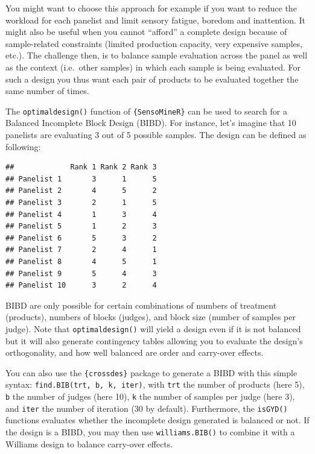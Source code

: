 \documentclass[
]{krantz}
\makeatletter
\newenvironment{Shaded}{\begin{snugshade}}{\end{snugshade}}
\newcommand{\AttributeTok}[1]{\textcolor[rgb]{0.61,0.61,0.61}{#1}}
\newcommand{\DecValTok}[1]{\textcolor[rgb]{0.06,0.06,0.06}{#1}}
\newcommand{\FunctionTok}[1]{\textcolor[rgb]{0,0,0}{#1}}
\newcommand{\NormalTok}[1]{#1}
\newcommand{\OtherTok}[1]{\textcolor[rgb]{0.37,0.37,0.37}{#1}}
\newcommand{\SpecialCharTok}[1]{\textcolor[rgb]{0,0,0}{#1}}
\newenvironment{kframe}{%
\medskip{}
\setlength{\fboxsep}{.8em}
 \def\at@end@of@kframe{}%
 \ifinner\ifhmode%
  \def\at@end@of@kframe{\end{minipage}}%
  \begin{minipage}{\columnwidth}%
 \fi\fi%
 \def\FrameCommand##1{\hskip\@totalleftmargin \hskip-\fboxsep
 \colorbox{shadecolor}{##1}\hskip-\fboxsep
     \hskip-\linewidth \hskip-\@totalleftmargin \hskip\columnwidth}%
 \MakeFramed {\advance\hsize-\width
   \@totalleftmargin\z@ \linewidth\hsize
   \@setminipage}}%
 {\par\unskip\endMakeFramed%
 \at@end@of@kframe}
\renewenvironment{Shaded}{\begin{kframe}}{\end{kframe}}
\makeatother
\begin{document}
You might want to choose this approach for example if you want to reduce the workload for each panelist and limit sensory fatigue, boredom and inattention. It might also be useful when you cannot ``afford'' a complete design because of sample-related constraints (limited production capacity, very expensive samples, etc.). The challenge then, is to balance sample evaluation across the panel as well as the context (i.e.~other samples) in which each sample is being evaluated. For such a design you thus want each pair of products to be evaluated together the same number of times.

The \texttt{optimaldesign()} function of \texttt{\{SensoMineR\}} can be used to search for a Balanced Incomplete Block Design (BIBD). For instance, let's imagine that 10 panelists are evaluating 3 out of 5 possible samples. The design can be defined as following:

\begin{Shaded}
\end{Shaded}

\begin{verbatim}
##             Rank 1 Rank 2 Rank 3
## Panelist 1       3      1      5
## Panelist 2       4      5      2
## Panelist 3       2      1      5
## Panelist 4       1      3      4
## Panelist 5       1      2      3
## Panelist 6       5      3      2
## Panelist 7       2      4      1
## Panelist 8       4      5      1
## Panelist 9       5      4      3
## Panelist 10      3      2      4
\end{verbatim}

BIBD are only possible for certain combinations of numbers of treatment (products), numbers of blocks (judges), and block size (number of samples per judge). Note that \texttt{optimaldesign()} will yield a design even if it is not balanced but it will also generate contingency tables allowing you to evaluate the design's orthogonality, and how well balanced are order and carry-over effects.

You can also use the \texttt{\{crossdes\}} package to generate a BIBD with this simple syntax: \texttt{find.BIB(trt,\ b,\ k,\ iter)}, with \texttt{trt} the number of products (here 5), \texttt{b} the number of judges (here 10), \texttt{k} the number of samples per judge (here 3), and \texttt{iter} the number of iteration (30 by default). Furthermore, the \texttt{isGYD()} functions evaluates whether the incomplete design generated is balanced or not. If the design is a BIBD, you may then use \texttt{williams.BIB()} to combine it with a Williams design to balance carry-over effects.
\end{document}
